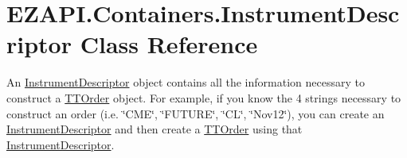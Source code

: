 \hypertarget{class_e_z_a_p_i_1_1_containers_1_1_instrument_descriptor}{\section{E\-Z\-A\-P\-I.\-Containers.\-Instrument\-Descriptor Class Reference}
\label{class_e_z_a_p_i_1_1_containers_1_1_instrument_descriptor}
}


An \hyperlink{class_e_z_a_p_i_1_1_containers_1_1_instrument_descriptor}{Instrument\-Descriptor} object contains all the information necessary to construct a \hyperlink{class_e_z_a_p_i_1_1_containers_1_1_t_t_order}{T\-T\-Order} object. For example, if you know the 4 strings necessary to construct an order (i.\-e. \char`\"{}\-C\-M\-E\char`\"{}, \char`\"{}\-F\-U\-T\-U\-R\-E\char`\"{}, \char`\"{}\-C\-L\char`\"{}, \char`\"{}\-Nov12\char`\"{}), you can create an \hyperlink{class_e_z_a_p_i_1_1_containers_1_1_instrument_descriptor}{Instrument\-Descriptor} and then create a \hyperlink{class_e_z_a_p_i_1_1_containers_1_1_t_t_order}{T\-T\-Order} using that \hyperlink{class_e_z_a_p_i_1_1_containers_1_1_instrument_descriptor}{Instrument\-Descriptor}.  


